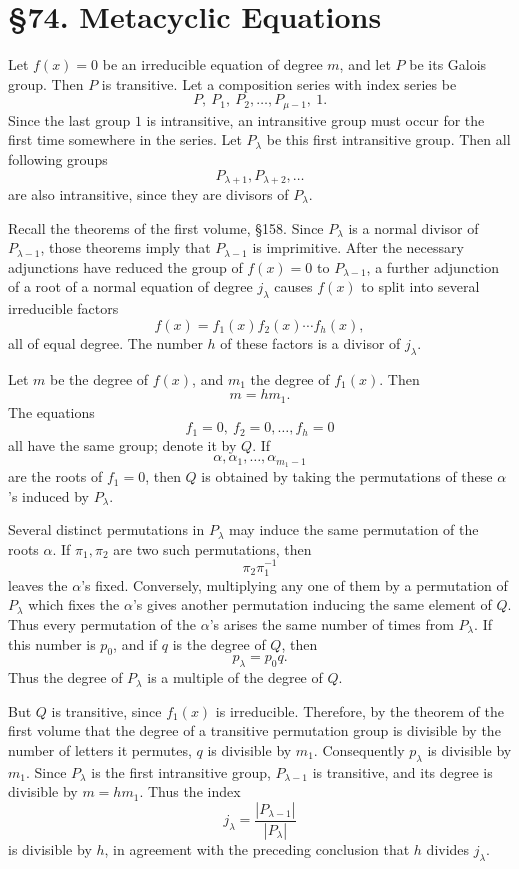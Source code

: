 \documentclass[11pt,a4paper]{book}
\newcommand{\webersection}[2]{\clearpage\section*{\S #1. #2}}
\begin{document}
\webersection{74}{Metacyclic Equations}

Let \(f(x)=0\) be an irreducible equation of degree \(m\), and let \(P\) be its Galois group.  Then \(P\) is transitive.  Let a composition series with index series be
\[
 P,\ P_1,\ P_2,\ldots,P_{\mu-1},\ 1.
\]
Since the last group \(1\) is intransitive, an intransitive group must occur for the first time somewhere in the series.  Let \(P_\lambda\) be this first intransitive group.  Then all following groups
\[
 P_{\lambda+1},P_{\lambda+2},\ldots
\]
are also intransitive, since they are divisors of \(P_\lambda\).

Recall the theorems of the first volume, \S 158.  Since \(P_\lambda\) is a normal divisor of \(P_{\lambda-1}\), those theorems imply that \(P_{\lambda-1}\) is imprimitive.  After the necessary adjunctions have reduced the group of \(f(x)=0\) to \(P_{\lambda-1}\), a further adjunction of a root of a normal equation of degree \(j_\lambda\) causes \(f(x)\) to split into several irreducible factors
\[
 f(x)=f_1(x)f_2(x)\cdots f_h(x),
\]
all of equal degree.  The number \(h\) of these factors is a divisor of \(j_\lambda\).

Let \(m\) be the degree of \(f(x)\), and \(m_1\) the degree of \(f_1(x)\).  Then
\[
 m=hm_1.
\]
The equations
\[
 f_1=0,\ f_2=0,\ldots,f_h=0
\]
all have the same group; denote it by \(Q\).  If
\[
 \alpha,\alpha_1,\ldots,\alpha_{m_1-1}
\]
are the roots of \(f_1=0\), then \(Q\) is obtained by taking the permutations of these \(\alpha\)'s induced by \(P_\lambda\).

Several distinct permutations in \(P_\lambda\) may induce the same permutation of the roots \(\alpha\).  If \(\pi_1,\pi_2\) are two such permutations, then
\[
 \pi_2\pi_1^{-1}
\]
leaves the \(\alpha\)'s fixed.  Conversely, multiplying any one of them by a permutation of \(P_\lambda\) which fixes the \(\alpha\)'s gives another permutation inducing the same element of \(Q\).  Thus every permutation of the \(\alpha\)'s arises the same number of times from \(P_\lambda\).  If this number is \(p_0\), and if \(q\) is the degree of \(Q\), then
\[
 p_\lambda=p_0q.
\]
Thus the degree of \(P_\lambda\) is a multiple of the degree of \(Q\).

But \(Q\) is transitive, since \(f_1(x)\) is irreducible.  Therefore, by the theorem of the first volume that the degree of a transitive permutation group is divisible by the number of letters it permutes, \(q\) is divisible by \(m_1\).  Consequently \(p_\lambda\) is divisible by \(m_1\).  Since \(P_\lambda\) is the first intransitive group, \(P_{\lambda-1}\) is transitive, and its degree is divisible by \(m=hm_1\).  Thus the index
\[
 j_\lambda=\frac{|P_{\lambda-1}|}{|P_\lambda|}
\]
is divisible by \(h\), in agreement with the preceding conclusion that \(h\) divides \(j_\lambda\).
\end{document}
